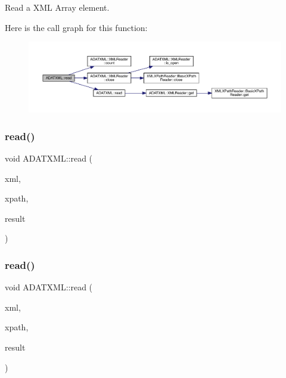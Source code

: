 Read a X\+ML Array element. 

Here is the call graph for this function\+:\nopagebreak
\begin{figure}[H]
\begin{center}
\leavevmode
\includegraphics[width=350pt]{d2/da3/group__io_gacca340ef5b3a2ee3626cb544539f5e64_cgraph}
\end{center}
\end{figure}
\mbox{\label{group__io_gae359122dfdc08b4e41d5d8f230426192}} 
\subsubsection{\texorpdfstring{read()}{read()}\hspace{0.1cm}{\footnotesize\ttfamily [39/52]}}
{\footnotesize\ttfamily void A\+D\+A\+T\+X\+M\+L\+::read (\begin{DoxyParamCaption}\item[{\mbox{\hyperlink{classADATXML_1_1XMLReader}{X\+M\+L\+Reader}} \&}]{xml,  }\item[{const std\+::string \&}]{xpath,  }\item[{std\+::list$<$ unsigned long int $>$ \&}]{result }\end{DoxyParamCaption})}

\mbox{\label{group__io_ga1a4d06e4f08869c717ad7db1a8fbfa2f}} 
\subsubsection{\texorpdfstring{read()}{read()}\hspace{0.1cm}{\footnotesize\ttfamily [40/52]}}
{\footnotesize\ttfamily void A\+D\+A\+T\+X\+M\+L\+::read (\begin{DoxyParamCaption}\item[{\mbox{\hyperlink{classADATXML_1_1XMLReader}{X\+M\+L\+Reader}} \&}]{xml,  }\item[{const std\+::string \&}]{xpath,  }\item[{std\+::list$<$ float $>$ \&}]{result }\end{DoxyParamCaption})}

